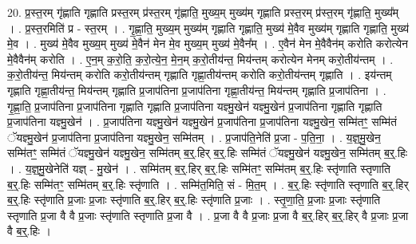\documentclass[17pt]{extarticle}
\begin{document}
20. प्र॒स्त॒रम् गृ॑ह्णाति गृह्णाति प्रस्त॒रम् प्र॑स्त॒रम् गृ॑ह्णाति॒ मुख्य॒म् मुख्य॑म् गृह्णाति प्रस्त॒रम् प्र॑स्त॒रम् गृ॑ह्णाति॒ मुख्य᳚म् । . प्र॒स्त॒रमिति॑ प्र - स्त॒रम् । . गृ॒ह्णा॒ति॒ मुख्य॒म् मुख्य॑म् गृह्णाति गृह्णाति॒ मुख्य॑ मे॒वैव मुख्य॑म् गृह्णाति गृह्णाति॒ मुख्य॑ मे॒व । . मुख्य॑ मे॒वैव मुख्य॒म् मुख्य॑ मे॒वैन॑ मेन मे॒व मुख्य॒म् मुख्य॑ मे॒वैन᳚म् । . ए॒वैन॑ मेन मे॒वैवैन॑म् करोति करोत्येन मे॒वैवैन॑म् करोति । . ए॒न॒म् क॒रो॒ति॒ क॒रो॒त्ये॒न॒ मे॒न॒म् क॒रो॒तीय॑न्त॒ मिय॑न्तम् करोत्येन मेनम् करो॒तीय॑न्तम् । . क॒रो॒तीय॑न्त॒ मिय॑न्तम् करोति करो॒तीय॑न्तम् गृह्णाति गृह्णा॒तीय॑न्तम् करोति करो॒तीय॑न्तम् गृह्णाति । . इय॑न्तम् गृह्णाति गृह्णा॒तीय॑न्त॒ मिय॑न्तम् गृह्णाति प्र॒जाप॑तिना प्र॒जाप॑तिना गृह्णा॒तीय॑न्त॒ मिय॑न्तम् गृह्णाति प्र॒जाप॑तिना । . गृ॒ह्णा॒ति॒ प्र॒जाप॑तिना प्र॒जाप॑तिना गृह्णाति गृह्णाति प्र॒जाप॑तिना यज्ञ्मु॒खेन॑ यज्ञ्मु॒खेन॑ प्र॒जाप॑तिना गृह्णाति गृह्णाति प्र॒जाप॑तिना यज्ञ्मु॒खेन॑ । . प्र॒जाप॑तिना यज्ञ्मु॒खेन॑ यज्ञ्मु॒खेन॑ प्र॒जाप॑तिना प्र॒जाप॑तिना यज्ञ्मु॒खेन॒ सम्मि॑तꣳ॒॒ सम्मि॑तं ॅयज्ञ्मु॒खेन॑ प्र॒जाप॑तिना प्र॒जाप॑तिना यज्ञ्मु॒खेन॒ सम्मि॑तम् । . प्र॒जाप॑ति॒नेति॑ प्र॒जा - प॒ति॒ना॒ । . य॒ज्ञ्॒मु॒खेन॒ सम्मि॑तꣳ॒॒ सम्मि॑तं ॅयज्ञ्मु॒खेन॑ यज्ञ्मु॒खेन॒ सम्मि॑तम् ब॒र्॒.हिर् ब॒र्॒.हिः सम्मि॑तं ॅयज्ञ्मु॒खेन॑ यज्ञ्मु॒खेन॒ सम्मि॑तम् ब॒र्॒.हिः । . य॒ज्ञ्॒मु॒खेनेति॑ यज्ञ् - मु॒खेन॑ । . सम्मि॑तम् ब॒र्॒.हिर् ब॒र्॒.हिः सम्मि॑तꣳ॒॒ सम्मि॑तम् ब॒र्॒.हिः स्तृ॑णाति स्तृणाति ब॒र्॒.हिः सम्मि॑तꣳ॒॒ सम्मि॑तम् ब॒र्॒.हिः स्तृ॑णाति । . सम्मि॑त॒मिति॒ सं - मि॒त॒म् । . ब॒र्॒.हिः स्तृ॑णाति स्तृणाति ब॒र्॒.हिर् ब॒र्॒.हिः स्तृ॑णाति प्र॒जाः प्र॒जाः स्तृ॑णाति ब॒र्॒.हिर् ब॒र्॒.हिः स्तृ॑णाति प्र॒जाः । . स्तृ॒णा॒ति॒ प्र॒जाः प्र॒जाः स्तृ॑णाति स्तृणाति प्र॒जा वै वै प्र॒जाः स्तृ॑णाति स्तृणाति प्र॒जा वै । . प्र॒जा वै वै प्र॒जाः प्र॒जा वै ब॒र्॒.हिर् ब॒र्॒.हिर् वै प्र॒जाः प्र॒जा वै ब॒र्॒.हिः । \newline
\end{document}
